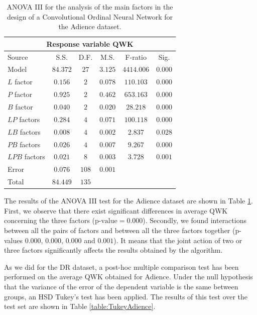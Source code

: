 \documentclass[journal]{IEEEtran}
\begin{document}
	\begin{table}[!t]
		\caption{ANOVA III for the analysis of the main factors in the design of a Convolutional Ordinal Neural Network for the Adience dataset.}
		\label{table:ANOVAAdience}
		\centering
		\small
		\begin{tabular}{lccccc}
			\hline\hline
			            \multicolumn{6}{c}{Response variable QWK}             \\ \hline
			Source        &   S.S.   & D.F.  &  M.S.   &  F-ratio   &  Sig.   \\ \hline
			Model         & $84.372$ & $27$  & $3.125$ & $4414.006$ & $0.000$ \\
			$L$ factor    & $0.156$  &  $2$  & $0.078$ & $110.103$  & $0.000$ \\
			$P$ factor    & $0.925$  &  $2$  & $0.462$ & $653.163$  & $0.000$ \\
			$B$ factor    & $0.040$  &  $2$  & $0.020$ &  $28.218$  & $0.000$ \\
			$LP$ factors  & $0.284$  &  $4$  & $0.071$ & $100.118$  & $0.000$ \\
			$LB$ factors  & $0.008$  &  $4$  & $0.002$ &  $2.837$   & $0.028$ \\
			$PB$ factors  & $0.026$  &  $4$  & $0.007$ &  $9.267$   & $0.000$ \\
			$LPB$ factors & $0.021$  &  $8$  & $0.003$ &  $3.728$   & $0.001$ \\
			Error         & $0.076$  & $108$ & $0.001$ &            &  \\ \hline
			Total         & $84.449$ & $135$ &         &            &  \\ \hline\hline
		\end{tabular}
	\end{table}
	
	The results of the ANOVA III test for the Adience dataset are shown in Table \ref{table:ANOVAAdience}. First, we observe that there exist significant differences in average QWK concerning the three factors ($\text{p-value} = 0.000$). Secondly, we found interactions between all the pairs of factors and between all the three factors together (p-values $0.000$, $0.000$, $0.000$ and $0.001$). It means that the joint action of two or three factors significantly affects the results obtained by the algorithm.
	
	As we did for the DR dataset, a post-hoc multiple comparison test has been performed on the average QWK obtained for Adience. Under the null hypothesis that the variance of the error of the dependent variable is the same between groups, an HSD Tukey's test has been applied. The results of this test over the test set are shown in Table \ref{table:TukeyAdience}.
	
\end{document}
